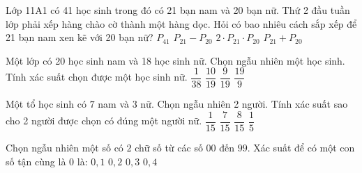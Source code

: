 \begin{ex}
Lớp 11A1 có 41 học sinh trong đó có 21 bạn nam và 20 bạn nữ. Thứ 2 đầu tuần lớp phải xếp hàng chào cờ thành một hàng dọc. Hỏi có bao nhiêu cách sắp xếp để 21 bạn nam xen kẽ với 20 bạn nữ?
\choice
{$P_{41}$}
{$P_{21}-P_{20}$}
{\True $2\cdot P_{21} \cdot P_{20}$}
{$P_{21}+P_{20}$}
\end{ex}
\begin{ex}
Một lớp có 20 học sinh nam và 18 học sinh nữ. Chọn ngẫu nhiên một học sinh. Tính xác suất chọn được một học sinh nữ.
\choice
{$\dfrac{1}{38}$}
{$\dfrac{10}{19}$}
{\True $\dfrac{9}{19}$}
{$\dfrac{19}{9}$}
\end{ex}
\begin{ex}
Một tổ học sinh có $7$ nam và $3$ nữ. Chọn ngẫu nhiên 2 người. Tính xác suất sao cho 2 người được chọn có đúng một người nữ.
\choice
{$\dfrac{1}{15}$}
{\True $\dfrac{7}{15}$}
{$\dfrac{8}{15}$}
{$\dfrac{1}{5}$}
\end{ex}
\begin{ex}
Chọn ngẫu nhiên một số có $2$ chữ số từ các số $00$ đến $99$. Xác suất để có một con số tận cùng là $0$ là:
\choice
{\True $0{,}1$}
{$0{,}2$}
{$0{,}3$}
{$0{,}4$}
\end{ex}
